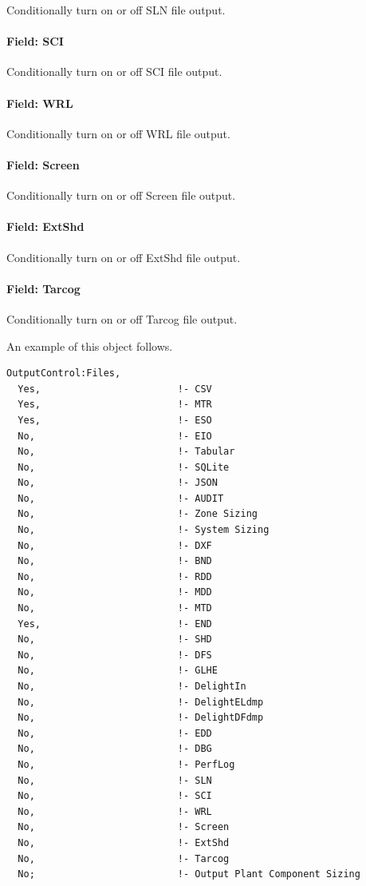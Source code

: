 Conditionally turn on or off SLN file output.

\paragraph{Field: SCI}\label{field-sci}

Conditionally turn on or off SCI file output.

\paragraph{Field: WRL}\label{field-wrl}

Conditionally turn on or off WRL file output.

\paragraph{Field: Screen}\label{field-screen}

Conditionally turn on or off Screen file output.

\paragraph{Field: ExtShd}\label{field-ext-shd}

Conditionally turn on or off ExtShd file output.

\paragraph{Field: Tarcog}\label{field-tarcog}

Conditionally turn on or off Tarcog file output.

An example of this object follows.

\begin{lstlisting}
OutputControl:Files,
  Yes,                        !- CSV
  Yes,                        !- MTR
  Yes,                        !- ESO
  No,                         !- EIO
  No,                         !- Tabular
  No,                         !- SQLite
  No,                         !- JSON
  No,                         !- AUDIT
  No,                         !- Zone Sizing
  No,                         !- System Sizing
  No,                         !- DXF
  No,                         !- BND
  No,                         !- RDD
  No,                         !- MDD
  No,                         !- MTD
  Yes,                        !- END
  No,                         !- SHD
  No,                         !- DFS
  No,                         !- GLHE
  No,                         !- DelightIn
  No,                         !- DelightELdmp
  No,                         !- DelightDFdmp
  No,                         !- EDD
  No,                         !- DBG
  No,                         !- PerfLog
  No,                         !- SLN
  No,                         !- SCI
  No,                         !- WRL
  No,                         !- Screen
  No,                         !- ExtShd
  No,                         !- Tarcog
  No;                         !- Output Plant Component Sizing
\end{lstlisting}

